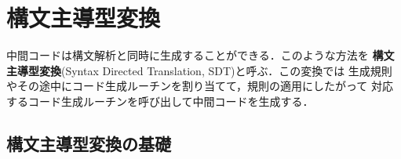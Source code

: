 \documentclass[dvipdfmx,a4j]{jbook}
\begin{document}

\section{構文主導型変換}

中間コードは構文解析と同時に生成することができる．このような方法を
{\bf 構文主導型変換}(Syntax Directed Translation, SDT)と呼ぶ．この変換では
生成規則やその途中にコード生成ルーチンを割り当てて，規則の適用にしたがって
対応するコード生成ルーチンを呼び出して中間コードを生成する．

\subsection{構文主導型変換の基礎}
\end{document}
